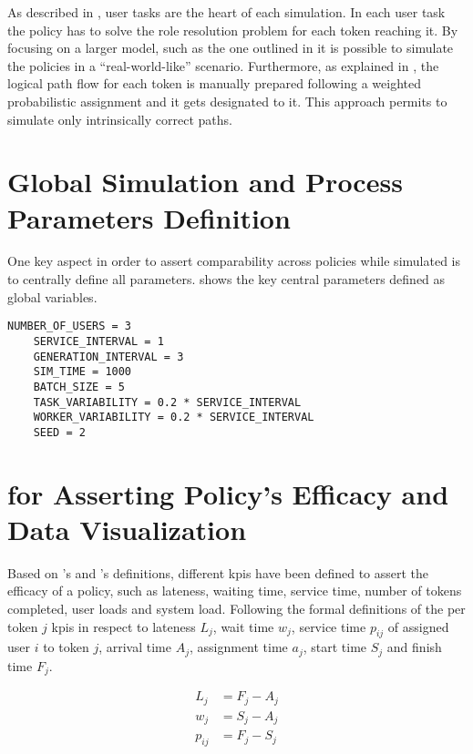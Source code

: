As described in , user tasks are the heart of each simulation. In each user task the policy has to solve the role resolution problem for each token reaching it. By focusing on a larger model, such as the one outlined in  it is possible to simulate the policies in a ``real-world-like'' scenario. Furthermore, as explained in , the logical path flow for each token is manually prepared following a weighted probabilistic assignment and it gets designated to it. This approach permits to simulate only intrinsically correct paths. 

\section{Global Simulation and Process Parameters Definition}

One key aspect in order to assert comparability across policies while simulated is to centrally define all parameters.  shows the key central parameters defined as global variables.

\begin{lstlisting}[caption=Global parameters definition that ensures comparability across simulation runs,label=lst:central_parameters,style=CustomPython]
	NUMBER_OF_USERS = 3
	SERVICE_INTERVAL = 1
	GENERATION_INTERVAL = 3
	SIM_TIME = 1000
	BATCH_SIZE = 5
	TASK_VARIABILITY = 0.2 * SERVICE_INTERVAL
	WORKER_VARIABILITY = 0.2 * SERVICE_INTERVAL
	SEED = 2
\end{lstlisting}

\section{ for Asserting Policy's Efficacy and Data Visualization}

Based on \citet{Pinedo2008}'s and \citet{Zeng2005}'s definitions, different \glspl{kpi} have been defined to assert the efficacy of a policy, such as lateness, waiting time, service time, number of tokens completed, user loads and system load. Following the formal definitions of the per token $j$ \glspl{kpi} in respect to lateness $L_j$, wait time $w_j$, service time $p_{ij}$ of assigned user $i$ to token $j$, arrival time $A_j$, assignment time $a_j$, start time $S_j$ and finish time $F_j$.

\begin{align}
	L_j&=F_j-A_j \label{eq:lateness}\\
	w_j&=S_j-A_j \\
	p_{ij}&=F_j-S_j
\end{align}

